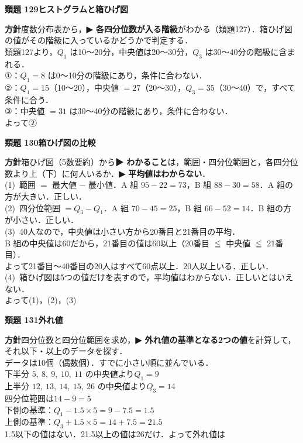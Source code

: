 \documentclass[a4paper,11pt]{ltjsarticle}
\newcommand{\ans}[2]{\Needspace{5\baselineskip}\vspace{6pt}%
  {\sffamily\bfseries 類題 #1\quad #2}\par}
\newcommand{\point}[1]{\textsf{\bfseries ▶ #1}}
\begin{document}
\ans{129}{ヒストグラムと箱ひげ図}
\begin{kai}
\textbf{方針}\quad 度数分布表から，\point{各四分位数が入る階級}がわかる（類題127）．箱ひげ図の値がその階級に入っているかどうかで判定する．\\[2pt]
類題127より，$Q_1$ は10〜20分，中央値は20〜30分，$Q_3$ は30〜40分の階級に含まれる．\\[2pt]
①：$Q_1=8$ は0〜10分の階級にあり，条件に合わない．\\
②：$Q_1=15$（10〜20），中央値 $=27$（20〜30），$Q_3=35$（30〜40）で，すべて条件に合う．\\
③：中央値 $=31$ は30〜40分の階級にあり，条件に合わない．\\[2pt]
よって\quad ②
\end{kai}

\ans{130}{箱ひげ図の比較}
\begin{kai}
\textbf{方針}\quad 箱ひげ図（5数要約）から\point{わかること}は，範囲・四分位範囲と，各四分位数より上（下）に何人いるか．\point{平均値はわからない}．\\[2pt]
(1)\ 範囲 $=$ 最大値 $-$ 最小値．A 組 $95-22=73$，B 組 $88-30=58$．A 組の方が大きい．\quad 正しい．\\[2pt]
(2)\ 四分位範囲 $=Q_3-Q_1$．A 組 $70-45=25$，B 組 $66-52=14$．B 組の方が小さい．\quad 正しい．\\[2pt]
(3)\ 40人なので，中央値は小さい方から20番目と21番目の平均．\\
\hspace*{1.5em}B 組の中央値は60だから，21番目の値は60以上（20番目 $\leqq$ 中央値 $\leqq$ 21番目）．\\
\hspace*{1.5em}よって21番目〜40番目の20人はすべて60点以上．20人以上いる．\quad 正しい．\\[2pt]
(4)\ 箱ひげ図は5つの値だけを表すので，平均値はわからない．\quad 正しいとはいえない．\\[2pt]
よって\quad (1)，(2)，(3)
\end{kai}

\ans{131}{外れ値}
\begin{kai}
\textbf{方針}\quad 四分位数と四分位範囲を求め，\point{外れ値の基準となる2つの値}を計算して，それ以下・以上のデータを探す．\\[2pt]
データは10個（偶数個）．すでに小さい順に並んでいる．\\
下半分 $5,\ 8,\ 9,\ 10,\ 11$ の中央値より\quad $Q_1=9$\\
上半分 $12,\ 13,\ 14,\ 15,\ 26$ の中央値より\quad $Q_3=14$\\
四分位範囲は\quad $14-9=5$\\[2pt]
下側の基準：$Q_1-1.5\times5=9-7.5=1.5$\\
上側の基準：$Q_3+1.5\times5=14+7.5=21.5$\\[2pt]
1.5以下の値はない．21.5以上の値は26だけ．\quad よって外れ値は
\end{kai}
\end{document}
